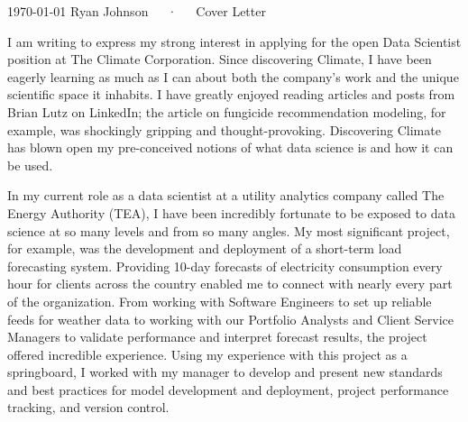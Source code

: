 \documentclass[14pt, a4paper]{awesome-cv}
\begin{document}
\makecvheader[R]

\makecvfooter
  {\today}
  {}
  {Ryan Johnson~~~·~~~Cover Letter}

\makelettertitle

\begin{cvletter}


I am writing to express my strong interest in applying for the open Data Scientist position at The Climate Corporation. Since discovering Climate, I have been eagerly learning as much as I can about both the company's work and the unique scientific space it inhabits. I have greatly enjoyed reading articles and posts from Brian Lutz on LinkedIn; the article on fungicide recommendation modeling, for example, was shockingly gripping and thought-provoking. Discovering Climate has blown open my pre-conceived notions of what data science is and how it can be used. 

In my current role as a data scientist at a utility analytics company called The Energy Authority (TEA), I have been incredibly fortunate to be exposed to data science at so many levels and from so many angles. My most significant project, for example, was the development and deployment of a short-term load forecasting system. Providing 10-day forecasts of electricity consumption every hour for clients across the country enabled me to connect with nearly every part of the organization. From working with Software Engineers to set up reliable feeds for weather data to working with our Portfolio Analysts and Client Service Managers to validate performance and interpret forecast results, the project offered incredible experience. Using my experience with this project as a springboard, I worked with my manager to develop and present new standards and best practices for model development and deployment, project performance tracking, and version control. 


\end{cvletter}
\end{document}
